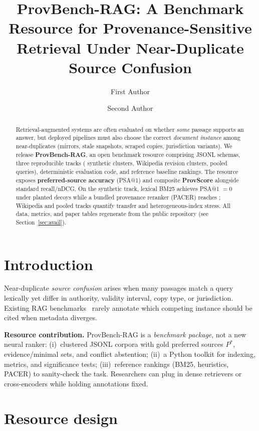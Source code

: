 \documentclass[sigconf]{acmart}
\author{First Author}
\affiliation{\institution{Your Institution}}
\author{Second Author}
\affiliation{\institution{Your Institution}}
\title{ProvBench-RAG: A Benchmark Resource for Provenance-Sensitive Retrieval Under Near-Duplicate Source Confusion}
\begin{document}
\begin{abstract}
Retrieval-augmented systems are often evaluated on whether \emph{some} passage supports an answer, but deployed pipelines must also choose the correct \emph{document instance} among near-duplicates (mirrors, stale snapshots, scraped copies, jurisdiction variants).
We release \textbf{ProvBench-RAG}, an open benchmark resource comprising JSONL schemas, three reproducible tracks (\ProvBenchNumQueries{} synthetic clusters, \WikiNumQueries{} Wikipedia revision clusters, \CombinedNumQueries{} pooled queries), deterministic evaluation code, and reference baseline rankings.
The resource exposes \textbf{preferred-source accuracy} (PSA@1) and composite \textbf{ProvScore} alongside standard recall/nDCG.
On the synthetic track, lexical BM25 achieves PSA@1 $=0$ under planted decoys while a bundled provenance reranker (PACER) reaches \ProvPacerPSA{}; Wikipedia and pooled tracks quantify transfer and heterogeneous-index stress.
All data, metrics, and paper tables regenerate from the public repository (see Section~\ref{sec:avail}).
\end{abstract}


\maketitle

\section{Introduction}
Near-duplicate \emph{source confusion} arises when many passages match a query lexically yet differ in authority, validity interval, copy type, or jurisdiction.
Existing RAG benchmarks~\cite{lewis2020retrieval,jacovi2025facts,krishna2024frames,huwiler2025versionrag} rarely annotate which competing instance should be cited when metadata diverges.

\textbf{Resource contribution.} ProvBench-RAG is a \emph{benchmark package}, not a new neural ranker: (i)~clustered JSONL corpora with gold preferred sources $P^\ast$, evidence/minimal sets, and conflict abstention; (ii)~a Python toolkit for indexing, metrics, and significance tests; (iii)~reference rankings (BM25, heuristics, PACER) to sanity-check the task.
Researchers can plug in dense retrievers or cross-encoders while holding annotations fixed.

\section{Resource design}
\end{document}
